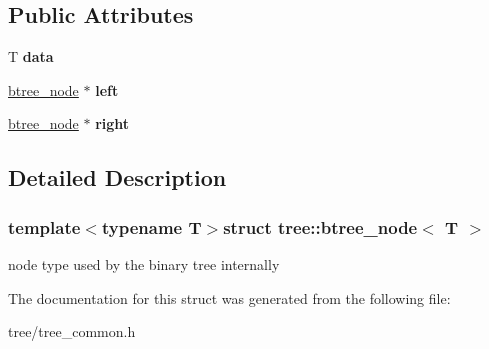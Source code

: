 \subsection*{\-Public \-Attributes}
\begin{DoxyCompactItemize}
\item 
\hypertarget{structtree_1_1btree__node_a1f44c7c53c16a4f8827b0f4b468d4531}{\-T {\bfseries data}}\label{structtree_1_1btree__node_a1f44c7c53c16a4f8827b0f4b468d4531}

\item 
\hypertarget{structtree_1_1btree__node_aed5a80dfa830209910c13f7a55b91b83}{\hyperlink{structtree_1_1btree__node}{btree\-\_\-node} $\ast$ {\bfseries left}}\label{structtree_1_1btree__node_aed5a80dfa830209910c13f7a55b91b83}

\item 
\hypertarget{structtree_1_1btree__node_a82e9a7410832850bc4c05a5eb63fab21}{\hyperlink{structtree_1_1btree__node}{btree\-\_\-node} $\ast$ {\bfseries right}}\label{structtree_1_1btree__node_a82e9a7410832850bc4c05a5eb63fab21}

\end{DoxyCompactItemize}


\subsection{\-Detailed \-Description}
\subsubsection*{template$<$typename T$>$struct tree\-::btree\-\_\-node$<$ T $>$}

node type used by the binary tree internally 

\-The documentation for this struct was generated from the following file\-:\begin{DoxyCompactItemize}
\item 
tree/tree\-\_\-common.\-h\end{DoxyCompactItemize}
